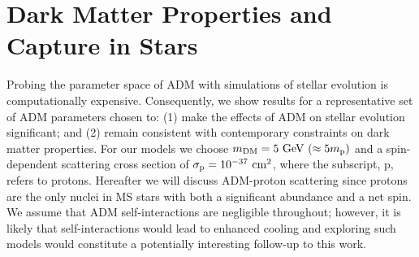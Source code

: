 \documentclass[useAMS,usenatbib]{mnras}
\begin{document}
%


\section{Dark Matter Properties and Capture in Stars}
\label{sec:props}

  Probing the parameter space of ADM with simulations of stellar evolution is computationally expensive. 
  Consequently, we show results for a representative set of ADM parameters chosen to: 
  (1) make the effects of ADM on stellar evolution significant; 
  and (2) remain consistent with contemporary constraints on dark matter properties. 
  For our models we choose $m_{\mathrm{DM}} = 5 \ \mathrm{GeV}\ (\approx 5m_{\mathrm{p}})$ and a spin-dependent 
  scattering cross section of $\sigma_{\mathrm{p}} = 10^{-37} \ \mathrm{cm}^2$, where the subscript, p, refers to protons.
  Hereafter we will discuss ADM-proton scattering since protons are the only nuclei in MS stars with both a significant abundance and a net spin.
  We assume that ADM self-interactions 
  are negligible throughout; however, it is likely that self-interactions would lead to enhanced 
  cooling \citep[e.g.,][]{Zentner2009High-energySun} and exploring such models would 
  constitute a potentially interesting follow-up to this work.


\end{document}
